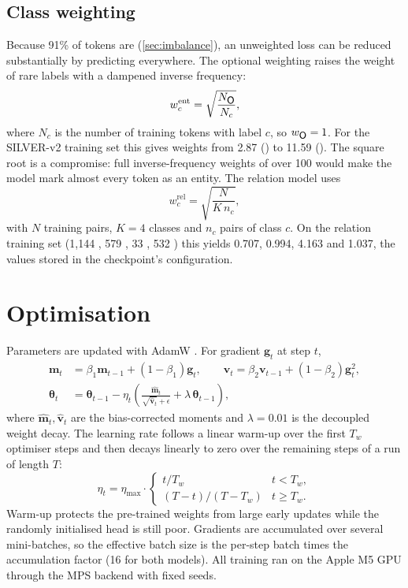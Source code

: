 \subsection{Class weighting}
Because 91\% of tokens are  (\cref{sec:imbalance}), an unweighted loss can be reduced substantially by predicting  everywhere. The optional  weighting raises the weight of rare labels with a dampened inverse frequency:
\begin{equation}
w_c^{\text{ent}} = \sqrt{\frac{N_{\lab{O}}}{N_c}},
\end{equation}
where $N_c$ is the number of training tokens with label $c$, so $w_{\lab{O}}=1$. For the SILVER-v2 training set this gives weights from 2.87 () to 11.59 (). The square root is a compromise: full inverse-frequency weights of over 100 would make the model mark almost every token as an entity. The relation model uses
\begin{equation}
w_c^{\text{rel}} = \sqrt{\frac{N}{K\,n_c}},
\end{equation}
with $N$ training pairs, $K=4$ classes and $n_c$ pairs of class $c$. On the relation training set (1,144 , 579 , 33 , 532 ) this yields 0.707, 0.994, 4.163 and 1.037, the values stored in the checkpoint's configuration.

\section{Optimisation}
Parameters are updated with AdamW \citep{loshchilov2019adamw}. For gradient $\mathbf{g}_t$ at step $t$,
\begin{align}
\mathbf{m}_t &= \beta_1\mathbf{m}_{t-1} + (1-\beta_1)\mathbf{g}_t, \qquad
\mathbf{v}_t = \beta_2\mathbf{v}_{t-1} + (1-\beta_2)\mathbf{g}_t^{2},\\
\boldsymbol{\theta}_t &= \boldsymbol{\theta}_{t-1} - \eta_t\left(\frac{\hat{\mathbf{m}}_t}{\sqrt{\hat{\mathbf{v}}_t}+\epsilon} + \lambda\,\boldsymbol{\theta}_{t-1}\right),
\end{align}
where $\hat{\mathbf{m}}_t,\hat{\mathbf{v}}_t$ are the bias-corrected moments and $\lambda=0.01$ is the decoupled weight decay. The learning rate follows a linear warm-up over the first $T_w$ optimiser steps and then decays linearly to zero over the remaining steps of a run of length $T$:
\begin{equation}
\eta_t = \eta_{\max}\cdot\begin{cases} t/T_w & t < T_w,\\ (T-t)/(T-T_w) & t \ge T_w.\end{cases}
\end{equation}
Warm-up protects the pre-trained weights from large early updates while the randomly initialised head is still poor. Gradients are accumulated over several mini-batches, so the effective batch size is the per-step batch times the accumulation factor (16 for both models). All training ran on the Apple M5 GPU through the MPS backend with fixed seeds.

